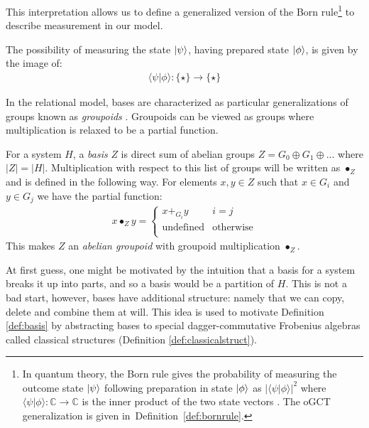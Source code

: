 This interpretation allows us to define a generalized version of the Born rule\footnote{In quantum theory, the Born rule gives the probability of measuring the outcome state $| \psi \rangle$ following preparation in state $| \phi \rangle$ as $|\langle\psi|\phi\rangle|^2$ where $\langle\psi|\phi\rangle:\mathbb{C}\to\mathbb{C}$ is the inner product of the two state vectors \cite{nielsen2010quantum}. The oGCT generalization is given in\ Definition~\ref{def:bornrule}.} to describe measurement in our model.
\begin{axiom}
The possibility of measuring the state $| \psi \rangle$, having prepared state $| \phi \rangle$, is given by the image of:
\begin{align}
\langle\psi|\phi\rangle:\{\star\}\to\{\star\}
\end{align}
\end{axiom}

In the relational model, bases are characterized as particular generalizations of groups known as \textit{groupoids} \cite{cqm-notes,pavlovic2009quantum}.  Groupoids can be viewed as groups where multiplication is relaxed to be a partial function.

\begin{defn}
\label{def:basis}
For a system $H$, a \emph{basis} $Z$ is direct sum of abelian groups $Z = G_0\oplus G_1\oplus...$ where $|Z| = |H|$.
Multiplication with respect to this list of groups will be written as $\bullet_Z$ and is defined in the following way. For elements $x,y\in Z$ such that $x\in G_i$ and $y\in G_j$ we have the partial function:
\begin{align}
\label{eq:groupoid_mult}
x\bullet_Zy = \begin{cases}
x +_{G_i} y & i=j \\
\mbox{undefined} & \mbox{otherwise}\\
\end{cases}
\end{align}
\noindent This makes $Z$ an \emph{abelian groupoid} with groupoid multiplication $\bullet_Z$.
\end{defn}

At first guess, one might be motivated by the intuition that a basis for a system breaks it up into parts, and so a basis would be a partition of $H$.  This is not a bad start, however, bases have additional structure: namely that we can copy, delete and combine them at will.  This idea is used to motivate Definition \ref{def:basis} by abstracting bases to special dagger-commutative Frobenius algebras called classical structures (Definition \ref{def:classicalstruct}).

